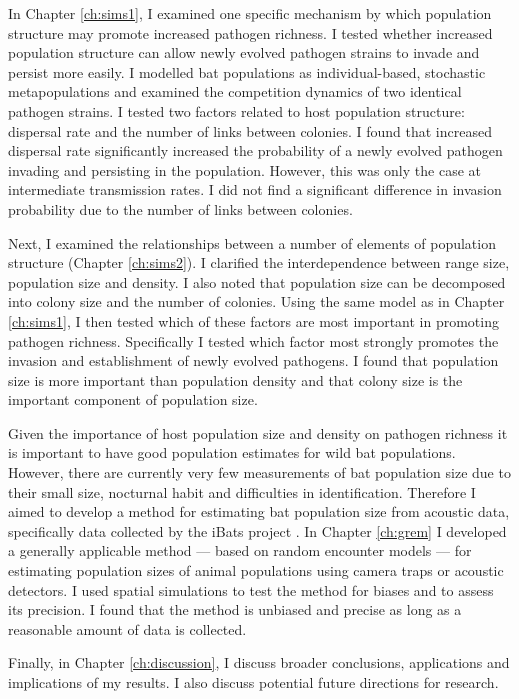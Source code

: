In Chapter \ref{ch:sims1}, I examined one specific mechanism by which population structure may promote increased pathogen richness.
I tested whether increased population structure can allow newly evolved pathogen strains to invade and persist more easily.
I modelled bat populations as individual-based, stochastic metapopulations and examined the competition dynamics of two identical pathogen strains.
I tested two factors related to host population structure: dispersal rate and the number of links between colonies.
I found that increased dispersal rate significantly increased the probability of a newly evolved pathogen invading and persisting in the population.
However, this was only the case at intermediate transmission rates.
I did not find a significant difference in invasion probability due to the number of links between colonies.


Next, I examined the relationships between a number of elements of population structure (Chapter \ref{ch:sims2}).
I clarified the interdependence between range size, population size and density.
I also noted that population size can be decomposed into colony size and the number of colonies.
Using the same model as in Chapter \ref{ch:sims1}, I then tested which of these factors are most important in promoting pathogen richness.
Specifically I tested which factor most strongly promotes the invasion and establishment of newly evolved pathogens.
I found that population size is more important than population density and that colony size is the important component of population size.


Given the importance of host population size and density on pathogen richness it is important to have good population estimates for wild bat populations.
However, there are currently very few measurements of bat population size due to their small size, nocturnal habit and difficulties in identification.
Therefore I aimed to develop a method for estimating bat population size from acoustic data, specifically data collected by the iBats project \cite{jones2011indicator}.
In Chapter \ref{ch:grem} I developed a generally applicable method --- based on random encounter models \cite{rowcliffe2008estimating, yapp1956theory} --- for estimating population sizes of animal populations using camera traps or acoustic detectors.
I used spatial simulations to test the method for biases and to assess its precision.
I found that the method is unbiased and precise as long as a reasonable amount of data is collected.



Finally, in Chapter \ref{ch:discussion}, I discuss broader conclusions, applications and implications of my results.
I also discuss potential future directions for research.












